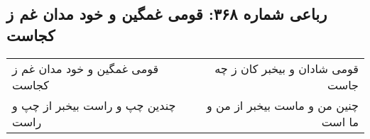 \begin{center}
\section*{رباعی شماره ۳۶۸: قومی غمگین و خود مدان غم ز کجاست}
\label{sec:0368}
\begin{longtable}{l p{0.5cm} r}
قومی غمگین و خود مدان غم ز کجاست
&&
قومی شادان و بیخبر کان ز چه جاست
\\
چندین چپ و راست بیخبر از چپ و راست
&&
چنین من و ماست بیخبر از من و ما است
\\
\end{longtable}
\end{center}
